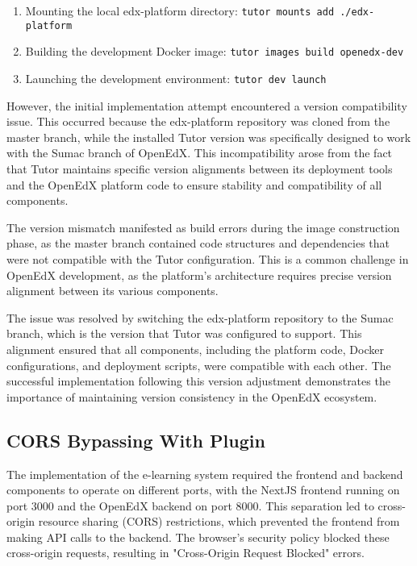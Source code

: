 \documentclass[../Main.tex]{subfiles}
\begin{document}
\begin{enumerate}
    \item Mounting the local edx-platform directory: \texttt{tutor mounts add ./edx-platform}
    \item Building the development Docker image: \texttt{tutor images build openedx-dev}
    \item Launching the development environment: \texttt{tutor dev launch}
\end{enumerate}

However, the initial implementation attempt encountered a version compatibility issue. This occurred because the edx-platform repository was cloned from the master branch, while the installed Tutor version was specifically designed to work with the Sumac branch of OpenEdX. This incompatibility arose from the fact that Tutor maintains specific version alignments between its deployment tools and the OpenEdX platform code to ensure stability and compatibility of all components.

The version mismatch manifested as build errors during the image construction phase, as the master branch contained code structures and dependencies that were not compatible with the Tutor configuration. This is a common challenge in OpenEdX development, as the platform's architecture requires precise version alignment between its various components.

The issue was resolved by switching the edx-platform repository to the Sumac branch, which is the version that Tutor was configured to support. This alignment ensured that all components, including the platform code, Docker configurations, and deployment scripts, were compatible with each other. The successful implementation following this version adjustment demonstrates the importance of maintaining version consistency in the OpenEdX ecosystem.

\subsection{CORS Bypassing With Plugin}
\label{section:5.2.3_cors_bypassing_with_plugin}

The implementation of the e-learning system required the frontend and backend components to operate on different ports, with the NextJS frontend running on port 3000 and the OpenEdX backend on port 8000. This separation led to cross-origin resource sharing (CORS) restrictions, which prevented the frontend from making API calls to the backend. The browser's security policy blocked these cross-origin requests, resulting in "Cross-Origin Request Blocked" errors.
\end{document}
